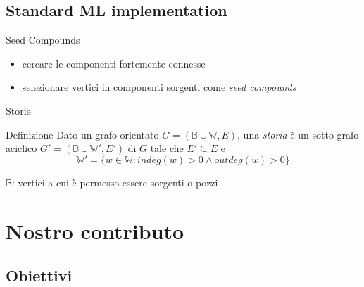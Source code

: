 \documentclass[8pt]{beamer}
\begin{document}
\subsection{Standard ML implementation}
\begin{frame}{Seed Compounds}
  \begin{itemize}
  \item cercare le componenti fortemente connesse
  \item selezionare vertici in componenti sorgenti come \emph{seed
      compounds}
  \end{itemize}

\end{frame}

\begin{frame}{Storie}
  \begin{block}{Definizione}
    Dato un grafo orientato $G = (\mathbb{B} \cup \mathbb{W}, E)$, una
    \emph{storia} \`e un sotto grafo aciclico $G' = (\mathbb{B} \cup
    \mathbb{W'}, E')$ di $G$ tale che $E' \subseteq E $ e
  \begin{displaymath}
    \mathbb{W'} = \{w \in \mathbb{W}: indeg(w) > 0 \wedge outdeg(w)
    > 0\}
  \end{displaymath}
\end{block}
$\mathbb{B}$: vertici a cui \`e permesso essere sorgenti o pozzi
\end{frame}

\section{Nostro contributo}

\subsection{Obiettivi}
\end{document}
